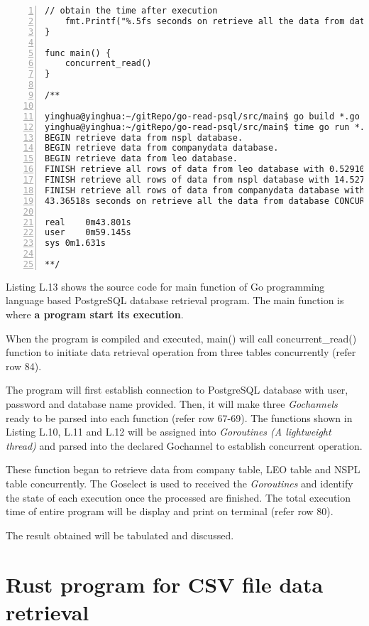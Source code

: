\begin{lstlisting}[breaklines, frame=single, numbers=left, caption={Main function for concurrent execution. (main.go)}, label=commandline-02]
	// obtain the time after execution
	fmt.Printf("%.5fs seconds on retrieve all the data from database CONCURRENTLY. \n", time.Since(start).Seconds())
}

func main() {
	concurrent_read()
}

/** 

yinghua@yinghua:~/gitRepo/go-read-psql/src/main$ go build *.go 
yinghua@yinghua:~/gitRepo/go-read-psql/src/main$ time go run *.go 
BEGIN retrieve data from nspl database.
BEGIN retrieve data from companydata database.
BEGIN retrieve data from leo database.
FINISH retrieve all rows of data from leo database with 0.52910s seconds.  
FINISH retrieve all rows of data from nspl database with 14.52721s seconds.  
FINISH retrieve all rows of data from companydata database with 43.36509s seconds.  
43.36518s seconds on retrieve all the data from database CONCURRENTLY. 

real	0m43.801s
user	0m59.145s
sys	0m1.631s

**/

\end{lstlisting}

Listing L.13 shows the source code for main function of Go programming language based PostgreSQL database retrieval program. The main function is where \textbf{a program start its execution}. 

When the program is compiled and executed, main() will call concurrent\_read() function to initiate data retrieval operation from three tables concurrently (refer row 84). 

The program will first establish connection to PostgreSQL database with user, password and database name provided. Then, it will make three \textit{Gochannels} ready to be parsed into each function (refer row 67-69). The functions shown in Listing L.10, L.11 and L.12 will be assigned into \textit{Goroutines (A lightweight thread)} and parsed into the declared Gochannel to establish concurrent operation. 

These function began to retrieve data from company table, LEO table and NSPL table concurrently. The Goselect is used to received the \textit{Goroutines} and identify the state of each execution once the processed are finished. The total execution time of entire program will be display and print on terminal (refer row 80). 

The result obtained will be tabulated and discussed.

\newpage 

\section{Rust program for CSV file data retrieval}


